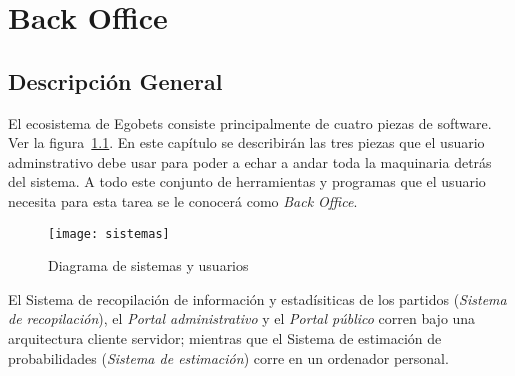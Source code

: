 \chapter{Back Office}
\section{Descripción General}

\graphicspath{{/Users/brunomedina/Dropbox/Tesis-Egobets/egobets-notas/resources/diagramas/}}
El ecosistema de Egobets consiste principalmente de cuatro piezas de software. Ver la figura~\ref{Fig:Sistemas}. En este capítulo se describirán las tres piezas que el usuario adminstrativo debe usar para poder a echar a andar toda la maquinaria detrás del sistema. A todo este conjunto de herramientas y programas que el usuario necesita para esta tarea se le conocerá como \emph{Back Office}.


\begin{figure}[!htb]\centering
   \begin {minipage}{1\textwidth}
     \texttt{[image: sistemas]}
     \caption{Diagrama de sistemas y usuarios}\label{Fig:Sistemas}
   \end{minipage}
\end{figure}

El Sistema de recopilación de información y estadísiticas de los partidos (\emph{Sistema de recopilación}), el \emph{Portal administrativo} y el \emph{Portal público} corren bajo una arquitectura cliente servidor; mientras que el Sistema de estimación de probabilidades (\emph{Sistema de estimación}) corre en un ordenador personal.

